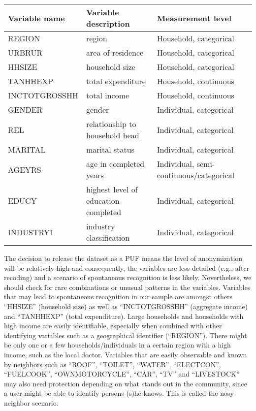 \documentclass[letterpaper,10pt,english]{sphinxmanual}
\begin{document}
\begin{savenotes}\sphinxattablestart
\centering
{}
\label{\detokenize{casestudies:tab919}}\label{\detokenize{casestudies:id40}}
\sphinxaftercaption
\begin{tabulary}{\linewidth}[t]{|T|T|T|}
\hline
\sphinxstyletheadfamily 
Variable name
&\sphinxstyletheadfamily 
Variable description
&\sphinxstyletheadfamily 
Measurement level
\\
\hline
REGION
&
region
&
Household,
categorical
\\
\hline
URBRUR
&
area of residence
&
Household,
categorical
\\
\hline
HHSIZE
&
household size
&
Household,
categorical
\\
\hline
TANHHEXP
&
total expenditure
&
Household, continuous
\\
\hline
INCTOTGROSSHH
&
total income
&
Household, continuous
\\
\hline
GENDER
&
gender
&
Individual,
categorical
\\
\hline
REL
&
relationship to
household head
&
Individual,
categorical
\\
\hline
MARITAL
&
marital status
&
Individual,
categorical
\\
\hline
AGEYRS
&
age in completed
years
&
Individual,
semi-continuous/categorical
\\
\hline
EDUCY
&
highest level of
education completed
&
Individual,
categorical
\\
\hline
INDUSTRY1
&
industry
classification
&
Individual,
categorical
\\
\hline
\end{tabulary}
\par
\sphinxattableend\end{savenotes}

The decision to release the dataset as a PUF means the level of
anonymization will be relatively high and consequently, the variables
are less detailed (e.g., after recoding) and a scenario of spontaneous
recognition is less likely. Nevertheless, we should check for rare
combinations or unusual patterns in the variables. Variables that may
lead to spontaneous recognition in our sample are amongst others
“HHSIZE” (household size) as well as “INCTOTGROSSHH” (aggregate income)
and “TANHHEXP” (total expenditure). Large households and households with
high income are easily identifiable, especially when combined with other
identifying variables such as a geographical identifier (“REGION”).
There might be only one or a few households/individuals in a certain
region with a high income, such as the local doctor. Variables that are
easily observable and known by neighbors such as “ROOF”, “TOILET”,
“WATER”, “ELECTCON”, “FUELCOOK”, “OWNMOTORCYCLE”, “CAR”, “TV” and
“LIVESTOCK” may also need protection depending on what stands out in the
community, since a user might be able to identify persons (s)he knows.
This is called the nosy-neighbor scenario.
\end{document}
